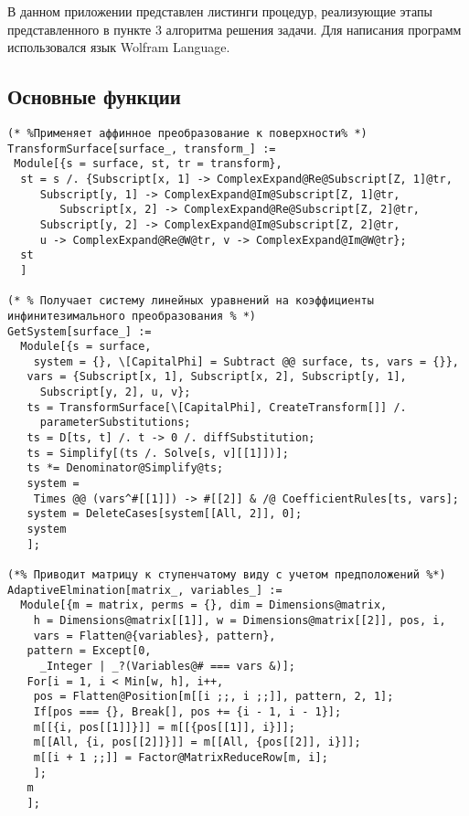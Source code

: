 \documentclass[../main.tex]{subfiles}
\begin{document}
В данном приложении представлен листинги процедур, реализующие этапы представленного в пункте 3 алгоритма решения задачи. Для написания программ использовался язык {\ttfamily Wolfram Language}.

\subsection{Основные функции}
\begin{lstlisting}
(* %Применяет аффинное преобразование к поверхности% *)
TransformSurface[surface_, transform_] :=
 Module[{s = surface, st, tr = transform},
  st = s /. {Subscript[x, 1] -> ComplexExpand@Re@Subscript[Z, 1]@tr,
     Subscript[y, 1] -> ComplexExpand@Im@Subscript[Z, 1]@tr,
     	Subscript[x, 2] -> ComplexExpand@Re@Subscript[Z, 2]@tr,
     Subscript[y, 2] -> ComplexExpand@Im@Subscript[Z, 2]@tr,
     u -> ComplexExpand@Re@W@tr, v -> ComplexExpand@Im@W@tr};
  st
  ]

(* % Получает систему линейных уравнений на коэффициенты инфинитезимального преобразования % *)
GetSystem[surface_] :=
  Module[{s = surface,
    system = {}, \[CapitalPhi] = Subtract @@ surface, ts, vars = {}},
   vars = {Subscript[x, 1], Subscript[x, 2], Subscript[y, 1],
     Subscript[y, 2], u, v};
   ts = TransformSurface[\[CapitalPhi], CreateTransform[]] /.
     parameterSubstitutions;
   ts = D[ts, t] /. t -> 0 /. diffSubstitution;
   ts = Simplify[(ts /. Solve[s, v][[1]])];
   ts *= Denominator@Simplify@ts;
   system =
    Times @@ (vars^#[[1]]) -> #[[2]] & /@ CoefficientRules[ts, vars];
   system = DeleteCases[system[[All, 2]], 0];
   system
   ];

(*% Приводит матрицу к ступенчатому виду с учетом предположений %*)
AdaptiveElmination[matrix_, variables_] :=
  Module[{m = matrix, perms = {}, dim = Dimensions@matrix,
    h = Dimensions@matrix[[1]], w = Dimensions@matrix[[2]], pos, i,
    vars = Flatten@{variables}, pattern},
   pattern = Except[0,
     _Integer | _?(Variables@# === vars &)];
   For[i = 1, i < Min[w, h], i++,
    pos = Flatten@Position[m[[i ;;, i ;;]], pattern, 2, 1];
    If[pos === {}, Break[], pos += {i - 1, i - 1}];
    m[[{i, pos[[1]]}]] = m[[{pos[[1]], i}]];
    m[[All, {i, pos[[2]]}]] = m[[All, {pos[[2]], i}]];
    m[[i + 1 ;;]] = Factor@MatrixReduceRow[m, i];
    ];
   m
   ];


\end{lstlisting}
\end{document}
